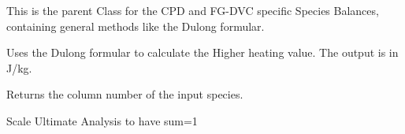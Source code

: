 \documentclass[letterpaper,10pt,english]{sphinxmanual}
\begin{document}
\begin{fulllineitems}
\label{FGDVCClasses:Compos_and_Energy.SpeciesBalance}
This is the parent Class for the CPD and FG-DVC specific Species Balances, containing general methods like the Dulong formular.

\begin{fulllineitems}
\label{FGDVCClasses:Compos_and_Energy.SpeciesBalance.Dulong}
Uses the Dulong formular to calculate the Higher heating value. The output is in J/kg.

\end{fulllineitems}


\begin{fulllineitems}
\label{FGDVCClasses:Compos_and_Energy.SpeciesBalance.SpeciesIndex}
Returns the column number of the input species.

\end{fulllineitems}


\begin{fulllineitems}
\label{FGDVCClasses:Compos_and_Energy.SpeciesBalance.correctUA}
Scale Ultimate Analysis to have sum=1

\end{fulllineitems}


\end{fulllineitems}

\end{document}
